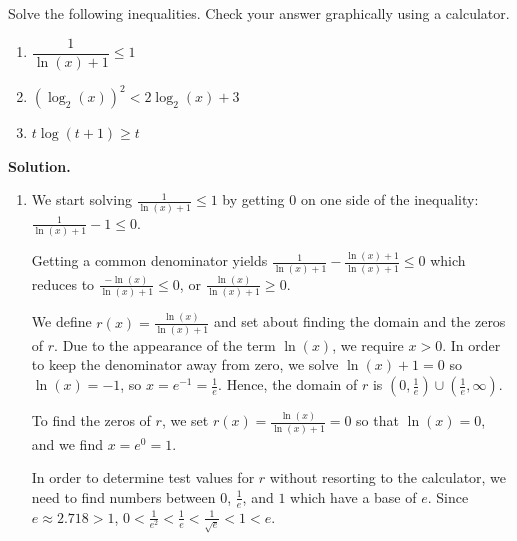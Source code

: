 \begin{ex}  Solve the following inequalities.  Check your answer graphically using a calculator.
\label{logineq}

\begin{multicols}{3}

\begin{enumerate}

\item  $\dfrac{1}{\ln(x)+1} \leq 1$

\item  $\left(\log_{2}(x)\right)^2 < 2 \log_{2}(x) + 3$

\item  $t \log(t+1) \geq t$


\end{enumerate}

\end{multicols}


{\bf Solution.}  

\begin{enumerate}

\item  We start solving $\frac{1}{\ln(x)+1} \leq 1$ by getting $0$ on one side of the inequality: $\frac{1}{\ln(x)+1}  - 1 \leq 0$.  

\smallskip

Getting a common denominator yields $\frac{1}{\ln(x)+1}  - \frac{\ln(x)+1}{\ln(x)+1} \leq 0$ which reduces to $\frac{-\ln(x)}{\ln(x)+1} \leq 0$, or $ \frac{\ln(x)}{\ln(x)+1} \geq 0$.  

\smallskip

We define $r(x) = \frac{\ln(x)}{\ln(x)+1}$ and set about finding the domain and the zeros of $r$.  Due to the appearance of the term $\ln(x)$, we require  $x > 0$.  In order to keep the denominator away from zero, we solve $\ln(x)+1 = 0$ so $\ln(x) = -1$, so $x = e^{-1} = \frac{1}{e}$.  Hence, the domain of $r$ is $\left(0, \frac{1}{e}\right) \cup \left(\frac{1}{e}, \infty\right)$. 

\smallskip

To find the zeros of $r$, we set $r(x) = \frac{\ln(x)}{\ln(x)+1} = 0$ so that $\ln(x) = 0$, and we find $x = e^{0} = 1$.  


\smallskip

In order to determine test values for $r$ without resorting to the calculator, we need to find numbers between $0$, $\frac{1}{e}$, and $1$ which have a base of $e$.  Since $e \approx 2.718 > 1$, $0 < \frac{1}{e^2} < \frac{1}{e} < \frac{1}{\sqrt{e}} < 1 < e$.  


\end{enumerate}
\end{ex}
